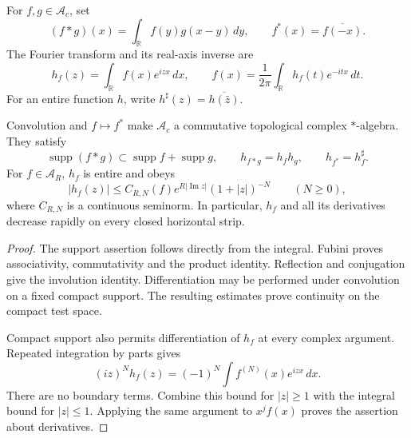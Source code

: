 \begin{definition}
\label{v4-arith:weil:def:compact}
For \(f,g\in\mathscr A_c\), set
\begin{equation}
 (f*g)(x)=\int_{\mathbb R}f(y)g(x-y)\,dy,\qquad
 f^*(x)=\overline{f(-x)}.
 \label{v4-arith:weil:eq:convolution}
\end{equation}
The Fourier transform and its real-axis inverse are
\begin{equation}
 h_f(z)=\int_{\mathbb R}f(x)e^{izx}\,dx,\qquad
 f(x)=\frac1{2\pi}\int_{\mathbb R}h_f(t)e^{-itx}\,dt.
 \label{v4-arith:weil:eq:fourier}
\end{equation}
For an entire function \(h\), write
\(h^\sharp(z)=\overline{h(\bar z)}\).
\end{definition}

\begin{proposition}
\label{v4-arith:weil:prop:algebra}
Convolution and \(f\mapsto f^*\) make \(\mathscr A_c\) a commutative
topological complex \(*\)-algebra. They satisfy
\begin{equation}
 \operatorname{supp}(f*g)\subset
 \operatorname{supp}f+\operatorname{supp}g,\qquad
 h_{f*g}=h_fh_g,\qquad h_{f^*}=h_f^\sharp.
 \label{v4-arith:weil:eq:fourier-algebra}
\end{equation}
For \(f\in\mathscr A_R\), \(h_f\) is entire and obeys
\[
 |h_f(z)|\le C_{R,N}(f)e^{R|\operatorname{Im}z|}
                       (1+|z|)^{-N}\qquad(N\ge0),
\]
where \(C_{R,N}\) is a continuous seminorm. In particular, \(h_f\) and all
its derivatives decrease rapidly on every closed horizontal strip.
\end{proposition}
\begin{proof}
The support assertion follows directly from the integral. Fubini proves
associativity, commutativity and the product identity. Reflection and
conjugation give the involution identity. Differentiation may be performed
under convolution on a fixed compact support. The resulting estimates
prove continuity on the compact test space.

Compact support also permits differentiation of \(h_f\) at every complex
argument. Repeated integration by parts gives
\[
 (iz)^Nh_f(z)=(-1)^N\int f^{(N)}(x)e^{izx}\,dx.
\]
There are no boundary terms. Combine this bound for \(|z|\ge1\) with the
integral bound for \(|z|\le1\). Applying the same argument to \(x^jf(x)\)
proves the assertion about derivatives.
\end{proof}

